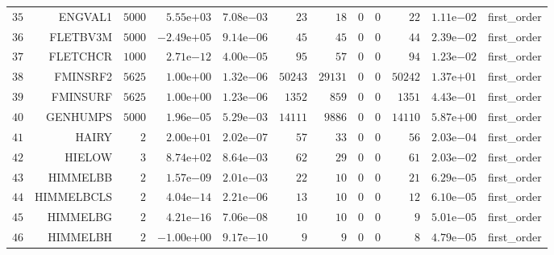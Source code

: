 \begin{longtable}{rrrrrrrrrrrr}
  \(    35\) & ENGVAL1 & \(  5000\) & \( 5.55\)e\(+03\) & \( 7.08\)e\(-03\) & \(    23\) & \(    18\) & \(     0\) & \(     0\) & \(    22\) & \( 1.11\)e\(-02\) & first\_order \\
  \(    36\) & FLETBV3M & \(  5000\) & \(-2.49\)e\(+05\) & \( 9.14\)e\(-06\) & \(    45\) & \(    45\) & \(     0\) & \(     0\) & \(    44\) & \( 2.39\)e\(-02\) & first\_order \\
  \(    37\) & FLETCHCR & \(  1000\) & \( 2.71\)e\(-12\) & \( 4.00\)e\(-05\) & \(    95\) & \(    57\) & \(     0\) & \(     0\) & \(    94\) & \( 1.23\)e\(-02\) & first\_order \\
  \(    38\) & FMINSRF2 & \(  5625\) & \( 1.00\)e\(+00\) & \( 1.32\)e\(-06\) & \( 50243\) & \( 29131\) & \(     0\) & \(     0\) & \( 50242\) & \( 1.37\)e\(+01\) & first\_order \\
  \(    39\) & FMINSURF & \(  5625\) & \( 1.00\)e\(+00\) & \( 1.23\)e\(-06\) & \(  1352\) & \(   859\) & \(     0\) & \(     0\) & \(  1351\) & \( 4.43\)e\(-01\) & first\_order \\
  \(    40\) & GENHUMPS & \(  5000\) & \( 1.96\)e\(-05\) & \( 5.29\)e\(-03\) & \( 14111\) & \(  9886\) & \(     0\) & \(     0\) & \( 14110\) & \( 5.87\)e\(+00\) & first\_order \\
  \(    41\) & HAIRY & \(     2\) & \( 2.00\)e\(+01\) & \( 2.02\)e\(-07\) & \(    57\) & \(    33\) & \(     0\) & \(     0\) & \(    56\) & \( 2.03\)e\(-04\) & first\_order \\
  \(    42\) & HIELOW & \(     3\) & \( 8.74\)e\(+02\) & \( 8.64\)e\(-03\) & \(    62\) & \(    29\) & \(     0\) & \(     0\) & \(    61\) & \( 2.03\)e\(-02\) & first\_order \\
  \(    43\) & HIMMELBB & \(     2\) & \( 1.57\)e\(-09\) & \( 2.01\)e\(-03\) & \(    22\) & \(    10\) & \(     0\) & \(     0\) & \(    21\) & \( 6.29\)e\(-05\) & first\_order \\
  \(    44\) & HIMMELBCLS & \(     2\) & \( 4.04\)e\(-14\) & \( 2.21\)e\(-06\) & \(    13\) & \(    10\) & \(     0\) & \(     0\) & \(    12\) & \( 6.10\)e\(-05\) & first\_order \\
  \(    45\) & HIMMELBG & \(     2\) & \( 4.21\)e\(-16\) & \( 7.06\)e\(-08\) & \(    10\) & \(    10\) & \(     0\) & \(     0\) & \(     9\) & \( 5.01\)e\(-05\) & first\_order \\
  \(    46\) & HIMMELBH & \(     2\) & \(-1.00\)e\(+00\) & \( 9.17\)e\(-10\) & \(     9\) & \(     9\) & \(     0\) & \(     0\) & \(     8\) & \( 4.79\)e\(-05\) & first\_order \\

\end{longtable}
